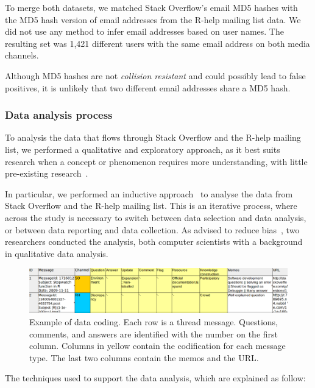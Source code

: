     To merge both datasets, we matched Stack Overflow's email MD5 hashes with the MD5 hash version of email addresses from the R-help mailing list data.
    We did not use any method to infer email addresses based on user names.
    The resulting set was 1,421 different users with the same email address on both media channels.

    Although MD5 hashes are not \textit{collision resistant} and could possibly lead to false positives, it is unlikely that two different email addresses share a MD5 hash.

\subsubsection{Data analysis process}
\label{sec:dap}

    To analysis the data that flows through Stack Overflow and the R-help mailing list, we performed a qualitative and exploratory approach, as it best suits research when a concept or phenomenon requires more understanding, with little pre-existing research~\cite{Creswell2009}.
    
    In particular, we performed an inductive approach~\cite{Runeson2012} to analyse the data from Stack Overflow and the R-help mailing list.
    This is an iterative process, where across the study is necessary to switch between data selection and data analysis, or between data reporting and data collection.
    As advised to reduce bias~\cite{Runeson2012}, two researchers conducted the analysis, both computer scientists with a background in qualitative data analysis.
    
    \begin{figure}[!htb]
    	\centering
    	\includegraphics[width=.95\textwidth]{Figures/CodingExample}
    	\caption{Example of data coding. Each row is a thread message. Questions, comments, and answers are identified with the number on the first column. Columns in yellow contain the codification for each message type. The last two columns contain the memos and the URL.}
    	\label{fig:CodingExample}
    \end{figure}

    The techniques used to support the data analysis, which are explained as follow:

